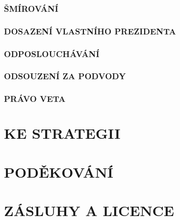 \documentclass{article}
\begin{document}

        \subsubsection*{ŠMÍROVÁNÍ} %


        \subsubsection*{DOSAZENÍ VLASTNÍHO PREZIDENTA}


        \subsubsection*{ODPOSLOUCHÁVÁNÍ}


        \subsubsection*{ODSOUZENÍ ZA PODVODY}


        \subsubsection*{PRÁVO VETA}


    \section*{KE STRATEGII}


    \section*{PODĚKOVÁNÍ}


    \section*{ZÁSLUHY A LICENCE}

\end{document}

